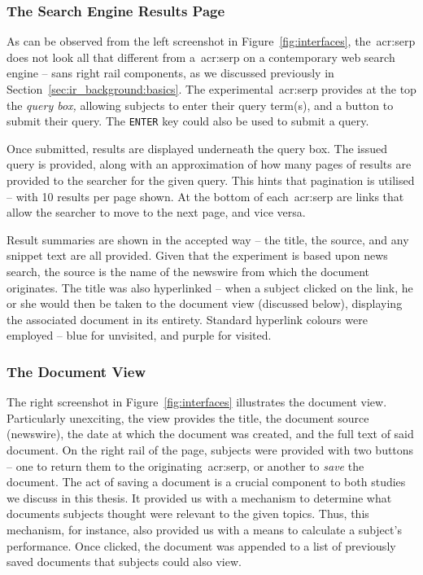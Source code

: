 \subsubsection{The Search Engine Results Page}
As can be observed from the left screenshot in Figure~\ref{fig:interfaces}, the~\gls{acr:serp} does not look all that different from a~\gls{acr:serp} on a contemporary web search engine -- sans right rail components, as we discussed previously in Section~\ref{sec:ir_background:basics}. The experimental~\gls{acr:serp} provides at the top the \emph{query box,} allowing subjects to enter their query term(s), and a button to submit their query. The \texttt{ENTER} key could also be used to submit a query.

Once submitted, results are displayed underneath the query box. The issued query is provided, along with an approximation of how many pages of results are provided to the searcher for the given query. This hints that pagination is utilised -- with 10 results per page shown. At the bottom of each~\gls{acr:serp} are links that allow the searcher to move to the next page, and vice versa.

Result summaries are shown in the accepted way -- the title, the source, and any snippet text are all provided. Given that the experiment is based upon news search, the source is the name of the newswire from which the document originates. The title was also hyperlinked -- when a subject clicked on the link, he or she would then be taken to the document view (discussed below), displaying the associated document in its entirety. Standard hyperlink colours were employed -- blue for unvisited, and purple for visited.

\subsubsection{The Document View}
The right screenshot in Figure~\ref{fig:interfaces} illustrates the document view. Particularly unexciting, the view provides the title, the document source (newswire), the date at which the document was created, and the full text of said document. On the right rail of the page, subjects were provided with two buttons -- one to return them to the originating~\gls{acr:serp}, or another to \emph{save} the document. The act of saving a document is a crucial component to both studies we discuss in this thesis. It provided us with a mechanism to determine what documents subjects thought were relevant to the given topics. Thus, this mechanism, for instance, also provided us with a means to calculate a subject's performance. Once clicked, the document was appended to a list of previously saved documents that subjects could also view.

